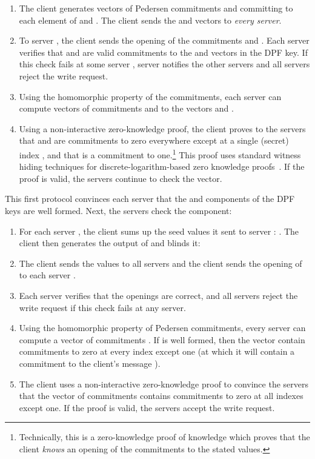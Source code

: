\documentclass[10pt,twocolumn]{article}
\begin{document}
\begin{enumerate}
  \item The client generates vectors of Pedersen commitments 
    and  committing to each element of  and .
    The client sends the  and  vectors to {\em every server}.
  \item To server , the client sends the opening of the commitments
     and .
    Each server  verifies that  and  are valid
    commitments to the  and  vectors in the DPF key.
    If this check fails at some server , server 
    notifies the other servers and all servers reject the write request.
  \item \label{item:check-commit}
    Using the homomorphic property of the commitments, each server can compute
    vectors of commitments  and 
    to the vectors  and .
  \item \label{item:check-proof}
    Using a non-interactive zero-knowledge proof, the client proves to 
    the servers that  and 
    are commitments to zero everywhere except at a single (secret) index ,
    and that  is a commitment to one.\footnote{
Technically, this is a zero-knowledge proof of knowledge
which proves that the client {\em knows} an opening of
the commitments to the stated values.
}
    This proof uses standard witness hiding techniques
    for discrete-logarithm-based zero knowledge 
    proofs~\cite{camenisch1997proof,cramer1994proofs}.
    If the proof is valid, the servers continue to check the  vector.
\end{enumerate}

This first protocol convinces each server that the  and  components
of the DPF keys are well formed.
Next, the servers check the  component:

\begin{enumerate}
  \item For each server , the client sums up the seed values  it
        sent to server : .
        The client then generates the output of  and blinds it: 
        
  \item The client sends the  values to all servers and the client
        sends the opening of  to each server .
  \item Each server verifies that the openings are correct, and all servers
        reject the write request if this check fails at any server.
  \item Using the homomorphic property of Pedersen commitments, every server
        can compute a vector of commitments 
        .
        If  is well formed, then the  vector
        contain commitments to zero at every index except one (at which it 
        will contain a commitment to the client's message ).
  \item \label{item:check-zkp}
        The client uses a non-interactive zero-knowledge proof to convince
        the servers that the vector of commitments
         contains commitments to zero at all indexes 
        except one.
        If the proof is valid, the servers accept the write request.
\end{enumerate}
\end{document}
